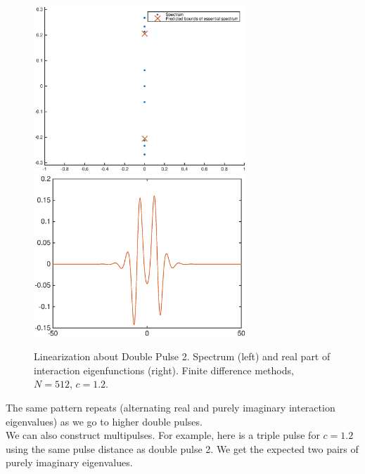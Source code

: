 \documentclass[12pt]{article}
\begin{document}
\begin{figure}[H]
\centering
\includegraphics[width=8cm]{spec12_double2.eps}
\includegraphics[width=8cm]{evecs12_double2real.eps}
\caption{Linearization about Double Pulse 2. Spectrum (left) and real part of interaction eigenfunctions (right). Finite difference methods, $N = 512$, $c = 1.2$.}
\end{figure}

The same pattern repeats (alternating real and purely imaginary interaction eigenvalues) as we go to higher double pulses.\\

We can also construct multipulses. For example, here is a triple pulse for $c = 1.2$ using the same pulse distance as double pulse 2. We get the expected two pairs of purely imaginary eigenvalues.
\end{document}
